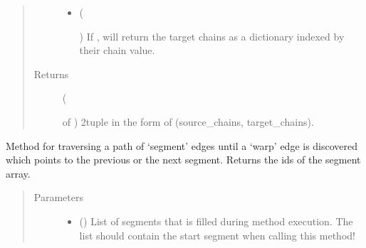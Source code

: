 \documentclass[letterpaper,10pt,english]{sphinxmanual}
\begin{document}
\begin{fulllineitems}
\begin{fulllineitems}
\begin{quote}
\begin{description}
\begin{itemize}
\item {} 
 (%
\begin{footnote}[156]\sphinxAtStartFootnote
{}
%
\end{footnote}) \textendash{} If , will return the target chains as a dictionary indexed
by their chain value.

\end{itemize}

\item[{Returns}] \leavevmode
{} (%
\begin{footnote}[157]\sphinxAtStartFootnote
{}
%
\end{footnote} of ) \textendash{} 2\sphinxhyphen{}tuple in the form of (source\_chains, target\_chains).

\end{description}\end{quote}

\end{fulllineitems}


\begin{fulllineitems}
\label{\detokenize{cockatoo:cockatoo.KnitMappingNetwork.traverse_segments_until_warp}}
Method for traversing a path of ‘segment’ edges until a ‘warp’
edge is discovered which points to the previous or the next segment.
Returns the ids of the segment array.
\begin{quote}\begin{description}
\item[{Parameters}] \leavevmode\begin{itemize}
\item {} 
 () \textendash{} List of segments that is filled during method execution. The list
should contain the start segment when calling this method!


\end{itemize}
\end{description}
\end{quote}
\end{fulllineitems}
\end{fulllineitems}
\end{document}
